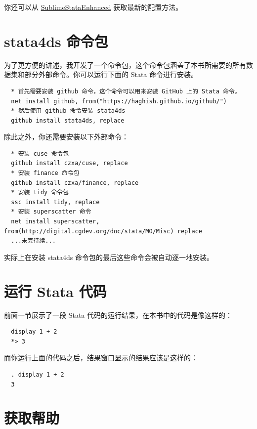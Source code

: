 你还可以从 \href{https://github.com/andrewheiss/SublimeStataEnhanced}{SublimeStataEnhanced} 获取最新的配置方法。

\section{stata4ds 命令包}

为了更方便的讲述，我开发了一个命令包，这个命令包涵盖了本书所需要的所有数据集和部分外部命令。你可以运行下面的 Stata 命令进行安装。

\begin{lstlisting}
  * 首先需要安装 github 命令，这个命令可以用来安装 GitHub 上的 Stata 命令。
  net install github, from("https://haghish.github.io/github/")
  * 然后使用 github 命令安装 stata4ds
  github install stata4ds, replace
\end{lstlisting}

除此之外，你还需要安装以下外部命令：

\begin{lstlisting}
  * 安装 cuse 命令包
  github install czxa/cuse, replace
  * 安装 finance 命令包
  github install czxa/finance, replace
  * 安装 tidy 命令包
  ssc install tidy, replace
  * 安装 superscatter 命令
  net install superscatter, from(http://digital.cgdev.org/doc/stata/MO/Misc) replace
  ...未完待续...
\end{lstlisting}

\begin{remark}
  实际上在安装 stata4ds 命令包的最后这些命令会被自动逐一地安装。
\end{remark}

\section{运行 Stata 代码}

前面一节展示了一段 Stata 代码的运行结果，在本书中的代码是像这样的：

\begin{lstlisting}
  display 1 + 2
  *> 3
\end{lstlisting}

而你运行上面的代码之后，结果窗口显示的结果应该是这样的：

\begin{lstlisting}
  . display 1 + 2
  3
\end{lstlisting}

\section{获取帮助}

